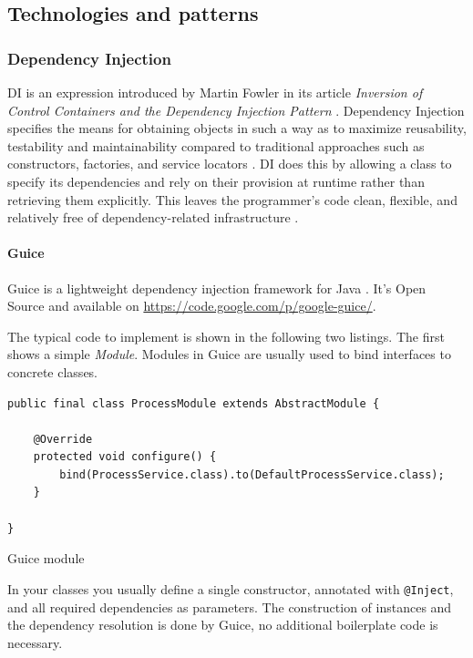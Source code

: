 \newpage
\subsection{Technologies and patterns}

\subsubsection{Dependency Injection}
\gls{DI} is an expression introduced by Martin Fowler in its article \textit{Inversion of Control Containers and the Dependency Injection Pattern} \cite{Fowler:2004}. Dependency Injection specifies the means for obtaining objects in such a way as to maximize reusability, testability and maintainability compared to traditional approaches such as constructors, factories, and service locators \cite{JSR330}. \gls{DI} does this by allowing a class to specify its dependencies and rely on their provision at runtime rather than retrieving them explicitly. This leaves the programmer's code clean, flexible, and relatively free of dependency-related infrastructure \cite{JSR330}.

\paragraph{Guice}
Guice is a lightweight dependency injection framework for Java \cite{Guice}. It's Open Source and available on \url{https://code.google.com/p/google-guice/}.

The typical code to implement is shown in the following two listings. The first shows a simple \textit{Module}. Modules in Guice are usually used to bind interfaces to concrete classes.

\begin{listing}[H]
\begin{verbatim}
public final class ProcessModule extends AbstractModule {

    @Override 
    protected void configure() {
        bind(ProcessService.class).to(DefaultProcessService.class);
    }

}
\end{verbatim}
\caption{Guice module}
\end{listing}

In your classes you usually define a single constructor, annotated with \texttt{@Inject}, and all required dependencies as parameters. The construction of instances and the dependency resolution is done by Guice, no additional boilerplate code is necessary.

